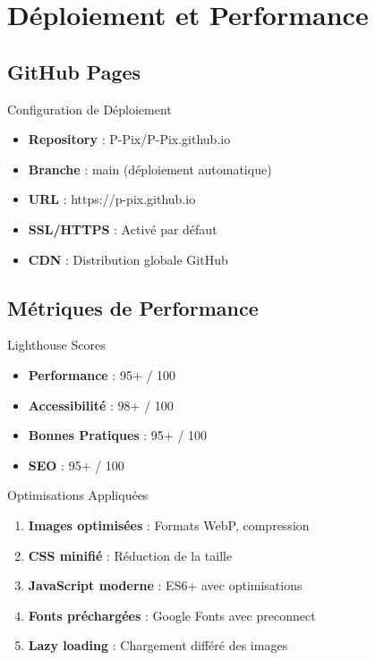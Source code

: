 \documentclass[12pt,a4paper]{article}
\begin{document}
\section{Déploiement et Performance}

\subsection{GitHub Pages}

\begin{greenbox}{Configuration de Déploiement}
\begin{itemize}[label=\textcolor{greencolor}{$\rightarrow$}]
    \item \textbf{Repository} : P-Pix/P-Pix.github.io
    \item \textbf{Branche} : main (déploiement automatique)
    \item \textbf{URL} : https://p-pix.github.io
    \item \textbf{SSL/HTTPS} : Activé par défaut
    \item \textbf{CDN} : Distribution globale GitHub
\end{itemize}
\end{greenbox}

\subsection{Métriques de Performance}

\begin{redbox}{Lighthouse Scores}
\begin{itemize}[label=\textcolor{redcolor}{$\star$}]
    \item \textbf{Performance} : 95+ / 100
    \item \textbf{Accessibilité} : 98+ / 100
    \item \textbf{Bonnes Pratiques} : 95+ / 100
    \item \textbf{SEO} : 95+ / 100
\end{itemize}
\end{redbox}

\begin{bluebox}{Optimisations Appliquées}
\begin{enumerate}[label=\textcolor{bluecolor}{\arabic*.}]
    \item \textbf{Images optimisées} : Formats WebP, compression
    \item \textbf{CSS minifié} : Réduction de la taille
    \item \textbf{JavaScript moderne} : ES6+ avec optimisations
    \item \textbf{Fonts préchargées} : Google Fonts avec preconnect
    \item \textbf{Lazy loading} : Chargement différé des images
\end{enumerate}
\end{bluebox}
\end{document}
